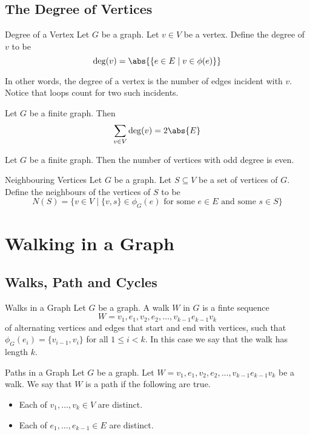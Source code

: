\documentclass[a4paper]{article}
\begin{document}
\subsection{The Degree of Vertices}
\begin{defn}{Degree of a Vertex}{} Let $G$ be a graph. Let $v\in V$ be a vertex. Define the degree of $v$ to be $$\deg(v)=\abs{\{e\in E\;|\;v\in\phi(e)\}}$$
\end{defn}

In other words, the degree of a vertex is the number of edges incident with $v$. Notice that loops count for two such incidents. 

\begin{prp}{}{} Let $G$ be a finite graph. Then $$\sum_{v\in V}\deg(v)=2\abs{E}$$
\end{prp}

\begin{crl}{}{} Let $G$ be a finite graph. Then the number of vertices with odd degree is even. 
\end{crl}

\begin{defn}{Neighbouring Vertices}{} Let $G$ be a graph. Let $S\subseteq V$ be a set of vertices of $G$. Define the neighbours of the vertices of $S$ to be $$N(S)=\{v\in V\;|\;\{v,s\}\in\phi_G(e)\text{ for some }e\in E\text{ and some }s\in S\}$$
\end{defn}

\pagebreak
\section{Walking in a Graph}
\subsection{Walks, Path and Cycles}
\begin{defn}{Walks in a Graph}{} Let $G$ be a graph. A walk $W$ in $G$ is a finte sequence $$W=v_1,e_1,v_2,e_2,\dots,v_{k-1}e_{k-1}v_k$$ of alternating vertices and edges that start and end with vertices, such that $\phi_G(e_i)=\{v_{i-1},v_i\}$ for all $1\leq i<k$. In this case we say that the walk has length $k$. 
\end{defn}

\begin{defn}{Paths in a Graph}{} Let $G$ be a graph. Let $W=v_1,e_1,v_2,e_2,\dots,v_{k-1}e_{k-1}v_k$ be a walk. We say that $W$ is a path if the following are true. 
\begin{itemize}
\item Each of $v_1,\dots,v_k\in V$ are distinct. 
\item Each of $e_1,\dots,e_{k-1}\in E$ are distinct. 
\end{itemize}
\end{defn}
\end{document}
